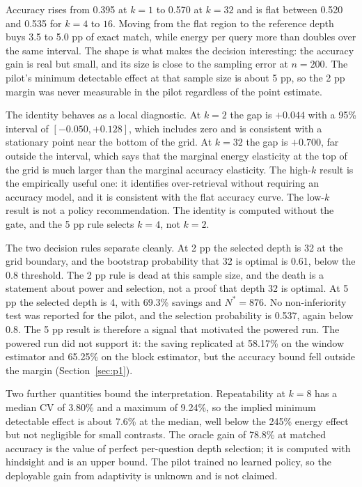\documentclass[a4paper,fleqn]{cas-sc}
\begin{document}
Accuracy rises from 0.395 at $k=1$ to 0.570 at $k=32$ and is flat between 0.520 and 0.535 for $k=4$ to $16$. Moving from the flat region to the reference depth buys 3.5 to 5.0 pp of exact match, while energy per query more than doubles over the same interval. The shape is what makes the decision interesting: the accuracy gain is real but small, and its size is close to the sampling error at $n=200$. The pilot's minimum detectable effect at that sample size is about 5 pp, so the 2 pp margin was never measurable in the pilot regardless of the point estimate.

The identity behaves as a local diagnostic. At $k=2$ the gap is $+0.044$ with a 95\% interval of $[-0.050,+0.128]$, which includes zero and is consistent with a stationary point near the bottom of the grid. At $k=32$ the gap is $+0.700$, far outside the interval, which says that the marginal energy elasticity at the top of the grid is much larger than the marginal accuracy elasticity. The high-$k$ result is the empirically useful one: it identifies over-retrieval without requiring an accuracy model, and it is consistent with the flat accuracy curve. The low-$k$ result is not a policy recommendation. The identity is computed without the gate, and the 5 pp rule selects $k=4$, not $k=2$.

The two decision rules separate cleanly. At 2 pp the selected depth is 32 at the grid boundary, and the bootstrap probability that 32 is optimal is 0.61, below the 0.8 threshold. The 2 pp rule is dead at this sample size, and the death is a statement about power and selection, not a proof that depth 32 is optimal. At 5 pp the selected depth is 4, with 69.3\% savings and $N^{*}=876$. No non-inferiority test was reported for the pilot, and the selection probability is 0.537, again below 0.8. The 5 pp result is therefore a signal that motivated the powered run. The powered run did not support it: the saving replicated at 58.17\% on the window estimator and 65.25\% on the block estimator, but the accuracy bound fell outside the margin (Section~\ref{sec:p1}).

Two further quantities bound the interpretation. Repeatability at $k=8$ has a median CV of 3.80\% and a maximum of 9.24\%, so the implied minimum detectable effect is about 7.6\% at the median, well below the 245\% energy effect but not negligible for small contrasts. The oracle gain of 78.8\% at matched accuracy is the value of perfect per-question depth selection; it is computed with hindsight and is an upper bound. The pilot trained no learned policy, so the deployable gain from adaptivity is unknown and is not claimed.
\end{document}
